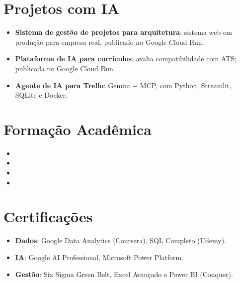 \documentclass[11pt,a4paper,sans]{moderncv}
\begin{document}

\section{Projetos com IA}
\vspace{1pt}
\begin{itemize}
\item {\textbf{Sistema de gestão de projetos para arquitetura}: sistema web em produção para empresa real, publicado no Google Cloud Run.}
\item {\textbf{Plataforma de IA para currículos}: avalia compatibilidade com ATS; publicada no Google Cloud Run.}
\item {\textbf{Agente de IA para Trello}: Gemini + MCP, com Python, Streamlit, SQLite e Docker.}
\end{itemize}


\section{Formação Acadêmica}
\vspace{1pt}
\begin{itemize}
\item{}
\item{}
\item{}
\item{}
\end{itemize}


\section{Certificações}
\vspace{1pt}
\begin{itemize}
\item {\textbf{Dados}: Google Data Analytics (Coursera), SQL Completo (Udemy).}
\item {\textbf{IA}: Google AI Professional, Microsoft Power Platform.}
\item {\textbf{Gestão}: Six Sigma Green Belt, Excel Avançado e Power BI (Conquer).}
\end{itemize}
\end{document}
